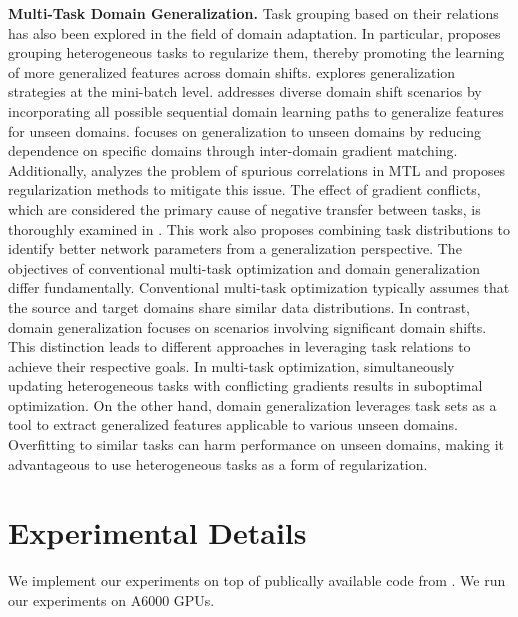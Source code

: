 \noindent\textbf{Multi-Task Domain Generalization.} Task grouping based on their relations has also been explored in the field of domain adaptation. In particular, \citep{wei2024task} proposes grouping heterogeneous tasks to regularize them, thereby promoting the learning of more generalized features across domain shifts. \citep{smith2021origin} explores generalization strategies at the mini-batch level. \citep{li2020sequential} addresses diverse domain shift scenarios by incorporating all possible sequential domain learning paths to generalize features for unseen domains. \citep{shi2021gradient} focuses on generalization to unseen domains by reducing dependence on specific domains through inter-domain gradient matching. Additionally, \citep{hu2022improving} analyzes the problem of spurious correlations in MTL and proposes regularization methods to mitigate this issue. The effect of gradient conflicts, which are considered the primary cause of negative transfer between tasks, is thoroughly examined in \citep{jiang2024forkmerge}. This work also proposes combining task distributions to identify better network parameters from a generalization perspective. The objectives of conventional multi-task optimization and domain generalization differ fundamentally. Conventional multi-task optimization typically assumes that the source and target domains share similar data distributions. In contrast, domain generalization focuses on scenarios involving significant domain shifts. This distinction leads to different approaches in leveraging task relations to achieve their respective goals. In multi-task optimization, simultaneously updating heterogeneous tasks with conflicting gradients results in suboptimal optimization. On the other hand, domain generalization leverages task sets as a tool to extract generalized features applicable to various unseen domains. Overfitting to similar tasks can harm performance on unseen domains, making it advantageous to use heterogeneous tasks as a form of regularization.



\section{Experimental Details}
\label{append:experimental_details}
\setcounter{table}{0}
\setcounter{figure}{0}
We implement our experiments on top of publically available code from \cite{ye2022invpt}. We run our experiments on A6000 GPUs.

